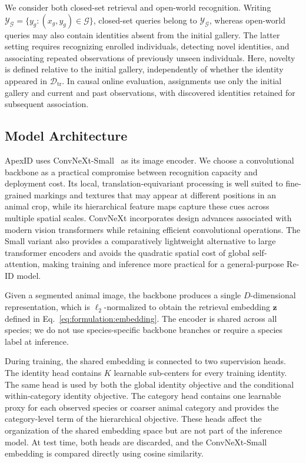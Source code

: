 We consider both closed-set retrieval and open-world
recognition. Writing
$\mathcal{Y}_{\mathcal{G}}
=\{y_g:(x_g,y_g)\in\mathcal{G}\}$,
closed-set queries belong to $\mathcal{Y}_{\mathcal{G}}$,
whereas open-world queries may also contain identities
absent from the initial gallery. The latter setting
requires recognizing enrolled individuals, detecting novel
identities, and associating repeated observations of
previously unseen individuals. Here, novelty is defined
relative to the initial gallery, independently of whether
the identity appeared in $\mathcal{D}_{\mathrm{tr}}$.
In causal online evaluation, assignments use only the
initial gallery and current and past observations, with
discovered identities retained for subsequent association.

\subsection{Model Architecture}
\label{sec:method:architecture}

ApexID uses ConvNeXt-Small~\cite{liu2022convnet} as its image encoder. We
choose a convolutional backbone as a practical compromise between recognition
capacity and deployment cost. Its local, translation-equivariant processing is
well suited to fine-grained markings and textures that may appear at different
positions in an animal crop, while its hierarchical feature maps capture these
cues across multiple spatial scales. ConvNeXt incorporates design advances
associated with modern vision transformers while retaining efficient
convolutional operations. The Small variant also provides a comparatively
lightweight alternative to large transformer encoders and avoids the
quadratic spatial cost of global self-attention, making training and inference
more practical for a general-purpose Re-ID model.

Given a segmented animal image, the backbone produces a single
$D$-dimensional representation, which is $\ell_2$-normalized to obtain the
retrieval embedding $\mathbf{z}$ defined in
Eq.~\eqref{eq:formulation:embedding}. The encoder is shared across all species;
we do not use species-specific backbone branches or require a species label at
inference.

During training, the shared embedding is connected to two supervision heads.
The identity head contains $K$ learnable sub-centers for every training
identity. The same head is used by both the global identity objective and the
conditional within-category identity objective. The category head contains one
learnable proxy for each observed species or coarser animal category and
provides the category-level term of the hierarchical objective. These heads
affect the organization of the shared embedding space but are not part of the
inference model. At test time, both heads are discarded, and the
ConvNeXt-Small embedding is compared directly using cosine similarity.

